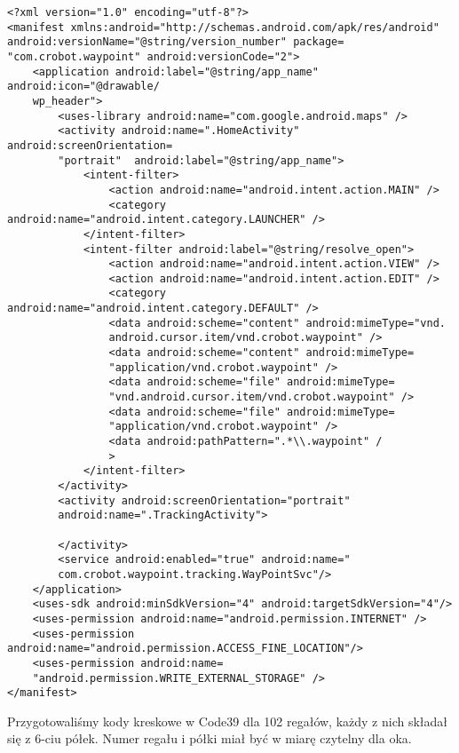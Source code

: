 \begin{lstlisting}
<?xml version="1.0" encoding="utf-8"?>
<manifest xmlns:android="http://schemas.android.com/apk/res/android" 
android:versionName="@string/version_number" package=
"com.crobot.waypoint" android:versionCode="2">
    <application android:label="@string/app_name" android:icon="@drawable/
    wp_header">
    	<uses-library android:name="com.google.android.maps" />
        <activity android:name=".HomeActivity" android:screenOrientation=
        "portrait"  android:label="@string/app_name">
            <intent-filter>
                <action android:name="android.intent.action.MAIN" />
                <category android:name="android.intent.category.LAUNCHER" />
            </intent-filter>
            <intent-filter android:label="@string/resolve_open">
            	<action android:name="android.intent.action.VIEW" />
            	<action android:name="android.intent.action.EDIT" />
            	<category android:name="android.intent.category.DEFAULT" />         
                <data android:scheme="content" android:mimeType="vnd.
                android.cursor.item/vnd.crobot.waypoint" />
                <data android:scheme="content" android:mimeType=
                "application/vnd.crobot.waypoint" />
                <data android:scheme="file" android:mimeType=
                "vnd.android.cursor.item/vnd.crobot.waypoint" />
                <data android:scheme="file" android:mimeType=
                "application/vnd.crobot.waypoint" />
				<data android:pathPattern=".*\\.waypoint" /
				>
            </intent-filter>
        </activity>
        <activity android:screenOrientation="portrait" 
        android:name=".TrackingActivity">
        	
        </activity>
        <service android:enabled="true" android:name="
        com.crobot.waypoint.tracking.WayPointSvc"/>
	</application>
    <uses-sdk android:minSdkVersion="4" android:targetSdkVersion="4"/>
    <uses-permission android:name="android.permission.INTERNET" />
	<uses-permission android:name="android.permission.ACCESS_FINE_LOCATION"/>
	<uses-permission android:name=
	"android.permission.WRITE_EXTERNAL_STORAGE" />
</manifest> 
\end{lstlisting}


Przygotowaliśmy kody kreskowe w Code39 dla 102 regałów, każdy z nich składał się z 6-ciu półek. Numer regału i półki miał być w miarę czytelny dla oka.

